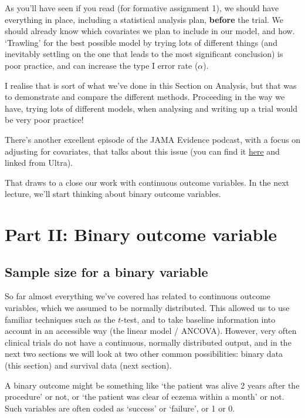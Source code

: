 \documentclass[
  openany]{book}
\theoremstyle{definition}
\theoremstyle{definition}
\theoremstyle{definition}
\theoremstyle{definition}
\theoremstyle{remark}
\begin{document}
As you'll have seen if you read \citet{kendall2003designing} (for formative assignment 1), we should have everything in place, including a statistical analysis plan, \textbf{before} the trial. We should already know which covariates we plan to include in our model, and how. `Trawling' for the best possible model by trying lots of different things (and inevitably settling on the one that leads to the most significant conclusion) is poor practice, and can increase the type I error rate (\(\alpha\)).

I realise that is sort of what we've done in this Section on Analysis, but that was to demonstrate and compare the different methods. Proceeding in the way we have, trying lots of different models, when analysing and writing up a trial would be very poor practice!

There's another excellent episode of the JAMA Evidence podcast, with a focus on adjusting for covariates, that talks about this issue (you can find it \href{https://edhub.ama-assn.org/jn-learning/audio-player/18836864}{here} and linked from Ultra).

That draws to a close our work with continuous outcome variables. In the next lecture, we'll start thinking about binary outcome variables.

\part{Part II: Binary outcome variable}\label{part-part-ii-binary-outcome-variable}

\chapter{Sample size for a binary variable}\label{ss-bin}

So far almost everything we've covered has related to continuous outcome variables, which we assumed to be normally distributed. This allowed us to use familiar techniques such as the \(t\)-test, and to take baseline information into account in an accessible way (the linear model / ANCOVA). However, very often clinical trials do not have a continuous, normally distributed output, and in the next two sections we will look at two other common possibilities: binary data (this section) and survival data (next section).

A binary outcome might be something like `the patient was alive 2 years after the procedure' or not, or `the patient was clear of eczema within a month' or not. Such variables are often coded as `success' or `failure', or 1 or 0.
\end{document}
